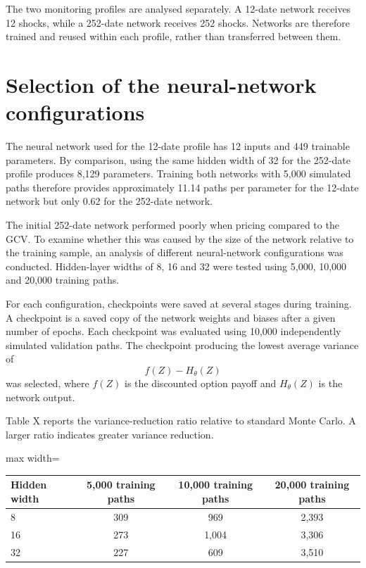 The two monitoring profiles are analysed separately. A 12-date network receives 12 shocks, while a 252-date network receives 252 shocks. Networks are therefore trained and reused within each profile, rather than transferred between them.

\section{Selection of the neural-network configurations}

The neural network used for the 12-date profile has 12 inputs and 449 trainable parameters. By comparison, using the same hidden width of 32 for the 252-date profile produces 8,129 parameters. Training both networks with 5,000 simulated paths therefore provides approximately 11.14 paths per parameter for the 12-date network but only 0.62 for the 252-date network.

The initial 252-date network performed poorly when pricing compared to the GCV. To examine whether this was caused by the size of the network relative to the training sample, an analysis of different neural-network configurations was conducted. Hidden-layer widths of 8, 16 and 32 were tested using 5,000, 10,000 and 20,000 training paths.

For each configuration, checkpoints were saved at several stages during training. A checkpoint is a saved copy of the network weights and biases after a given number of epochs. Each checkpoint was evaluated using 10,000 independently simulated validation paths. The checkpoint producing the lowest average variance of
\[
f(Z)-H_\theta(Z)
\]
was selected, where $f(Z)$ is the discounted option payoff and $H_\theta(Z)$ is the network output.

Table X reports the variance-reduction ratio relative to standard Monte Carlo. A larger ratio indicates greater variance reduction.

\begin{table}[h]
\centering
\begin{adjustbox}{max width=\textwidth}
\begin{tabular}{lccc}
\hline
Hidden width & 5,000 training paths & 10,000 training paths & 20,000 training paths \\
\hline
8 & 309 & 969 & 2,393 \\
16 & 273 & 1,004 & 3,306 \\
32 & 227 & 609 & 3,510 \\
\hline
\end{tabular}
\end{adjustbox}
\end{table}

